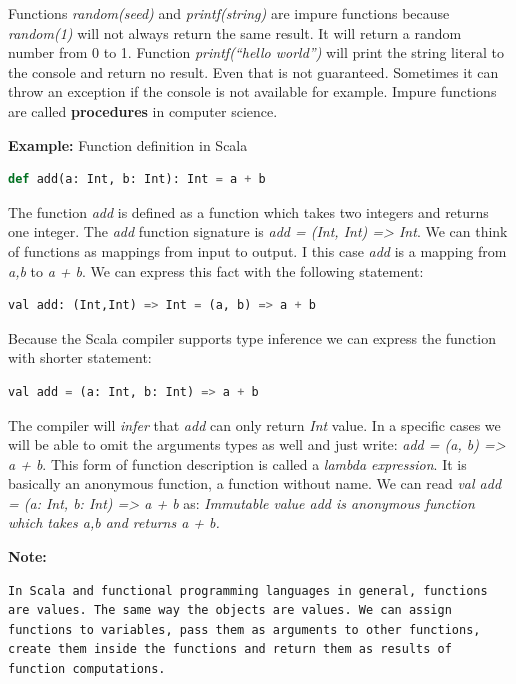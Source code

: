 \documentclass[12pt,twoside,a4paper]{report}
\begin{document}
Functions \emph{random(seed)} and \emph{printf(string)} are impure functions because \emph{random(1)} will not always return the same result. It will return a random number from 0 to 1. Function \emph{printf(“hello world”)} will print the string literal to the console and return no result. Even that is not guaranteed. Sometimes it can throw an exception if the console is not available for example. Impure functions are called \textbf{procedures} in computer science.

\textbf{Example:} Function definition in Scala
\begin{lstlisting}[language=python]
def add(a: Int, b: Int): Int = a + b
\end{lstlisting}

The function \emph{add} is defined as a function which takes two integers and returns one integer. The \emph{add} function signature is \emph{add = (Int, Int) => Int}. We can think of functions as mappings from input to output. I this case \emph{add} is a mapping from \emph{a,b} to \emph{a + b}. We can express this fact with the following statement:

\begin{lstlisting}[language=python]
val add: (Int,Int) => Int = (a, b) => a + b
\end{lstlisting}

Because the Scala compiler supports type inference we can express the function with shorter statement:
\begin{lstlisting}[language=python]
val add = (a: Int, b: Int) => a + b
\end{lstlisting}

The compiler will \emph{infer} that \emph{add} can only return \emph{Int} value. In a specific cases we will be able to omit the arguments types as well and just write: \emph{add = (a, b) => a + b}. This form of function description is called a \emph{lambda expression}. It is basically an anonymous function, a function without name. We can read \emph{val add = (a: Int, b: Int) => a + b} as: \emph{Immutable value add is anonymous function which takes a,b and returns a + b.}

\textbf{Note:}
\begin{lstlisting}
In Scala and functional programming languages in general, functions are values. The same way the objects are values. We can assign functions to variables, pass them as arguments to other functions, create them inside the functions and return them as results of function computations. 
\end{lstlisting}
\end{document}
